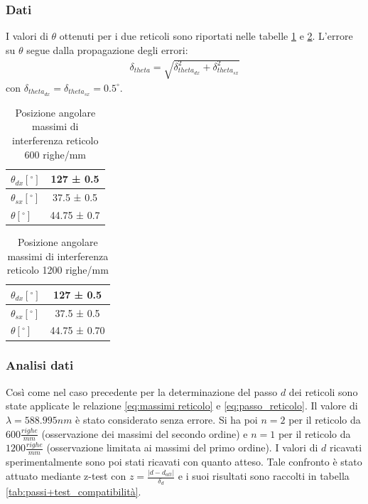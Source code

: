 \documentclass[a4paper]{article}
\begin{document}
\subsubsection{Dati}
I valori di $\theta$ ottenuti per i due reticoli sono riportati nelle tabelle \ref{tab:angoli_600} e \ref{tab:angoli_1200}. L'errore su $\theta$ segue dalla propagazione degli errori:
\begin{align}
\delta_{theta} = \sqrt{\delta_{theta_{dx}}^2+\delta_{theta_{sx}}^2}
\end{align}
con $\delta_{theta_{dx}} =\delta_{theta_{sx}}= 0.5^\circ$.

\begin{table}[htbp]
\centering
\begin{tabular}{|l|c|}
\hline
$\theta_{dx} [^\circ]$ & 127 ± 0.5 \\\hline
$\theta_{sx} [^\circ]$ & 37.5 ± 0.5 \\\hline
$\theta [^\circ]$ & 44.75 ± 0.7  \\\hline
\end{tabular}
\caption{Posizione angolare massimi di interferenza reticolo 600 righe/mm}
\label{tab:angoli_600}
\end{table}

\begin{table}[htbp]
\centering
\begin{tabular}{|l|c|}
\hline
$\theta_{dx} [^\circ]$ & 127 ± 0.5 \\\hline
$\theta_{sx} [^\circ]$ & 37.5 ± 0.5 \\\hline
$\theta [^\circ]$ & 44.75 ± 0.70  \\\hline
\end{tabular}
\caption{Posizione angolare massimi di interferenza reticolo 1200 righe/mm}
\label{tab:angoli_1200}
\end{table}

\subsubsection{Analisi dati}
Così come nel caso precedente per la determinazione del passo $d$ dei reticoli sono state applicate le relazione \ref{eq:massimi reticolo} e \ref{eq:passo_reticolo}. Il valore di $\lambda=588.995 nm$ è stato considerato senza errore. Si ha poi $n=2$ per il reticolo da $600 \frac{righe}{mm}$ (osservazione dei massimi del secondo ordine) e $n=1$ per il reticolo da $1200 \frac{righe}{mm}$ (osservazione limitata ai massimi del primo ordine). I valori di $d$ ricavati sperimentalmente sono poi stati ricavati con quanto atteso. Tale confronto è stato attuato mediante z-test con $z = \frac{|d-d_{att}|}{\delta_d}$ e i suoi risultati sono raccolti in tabella \ref{tab:passi+test_compatibilità}.
\end{document}

